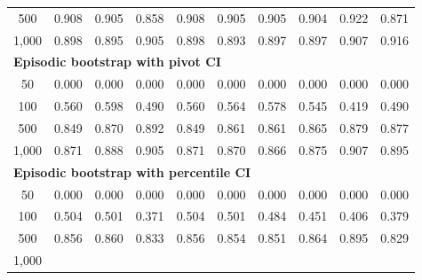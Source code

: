 \documentclass{article}
\numberwithin{equation}{section}
\begin{document}
\begin{table}[ht]
\begin{tabular}{c|ccc|cccccc}
500
& \cellcolor{covheat!100!white}0.908 & \cellcolor{covheat!100!white}0.905 & \cellcolor{covheat!79!white}0.858
& \cellcolor{covheat!100!white}0.908 & \cellcolor{covheat!100!white}0.905 & \cellcolor{covheat!100!white}0.905 & \cellcolor{covheat!100!white}0.904 & \cellcolor{covheat!100!white}0.922 & \cellcolor{covheat!85!white}0.871 \\
1{,}000
& \cellcolor{covheat!99!white}0.898 & \cellcolor{covheat!98!white}0.895 & \cellcolor{covheat!100!white}0.905
& \cellcolor{covheat!99!white}0.898 & \cellcolor{covheat!96!white}0.893 & \cellcolor{covheat!98!white}0.897 & \cellcolor{covheat!98!white}0.897 & \cellcolor{covheat!100!white}0.907 & \cellcolor{covheat!100!white}0.916 \\
\hline
\multicolumn{10}{l}{\textbf{Episodic bootstrap with pivot CI}} \\ \hline
50
& 0.000 & 0.000 & 0.000
& 0.000 & 0.000 & 0.000 & 0.000 & 0.000 & 0.000 \\
100
& 0.560 & 0.598 & 0.490
& 0.560 & 0.564 & 0.578 & 0.545 & 0.419 & 0.490 \\
500
& \cellcolor{covheat!74!white}0.849 & \cellcolor{covheat!85!white}0.870 & \cellcolor{covheat!96!white}0.892
& \cellcolor{covheat!74!white}0.849 & \cellcolor{covheat!80!white}0.861 & \cellcolor{covheat!80!white}0.861 & \cellcolor{covheat!82!white}0.865 & \cellcolor{covheat!89!white}0.879 & \cellcolor{covheat!88!white}0.877 \\
1{,}000
& \cellcolor{covheat!85!white}0.871 & \cellcolor{covheat!94!white}0.888 & \cellcolor{covheat!100!white}0.905
& \cellcolor{covheat!85!white}0.871 & \cellcolor{covheat!85!white}0.870 & \cellcolor{covheat!83!white}0.866 & \cellcolor{covheat!87!white}0.875 & \cellcolor{covheat!100!white}0.907 & \cellcolor{covheat!98!white}0.895 \\
\hline
\multicolumn{10}{l}{\textbf{Episodic bootstrap with percentile CI}} \\ \hline
50
& 0.000 & 0.000 & 0.000
& 0.000 & 0.000 & 0.000 & 0.000 & 0.000 & 0.000 \\
100
& 0.504 & 0.501 & 0.371
& 0.504 & 0.501 & 0.484 & 0.451 & 0.406 & 0.379 \\
500
& \cellcolor{covheat!78!white}0.856 & \cellcolor{covheat!80!white}0.860 & \cellcolor{covheat!66!white}0.833
& \cellcolor{covheat!78!white}0.856 & \cellcolor{covheat!77!white}0.854 & \cellcolor{covheat!75!white}0.851 & \cellcolor{covheat!82!white}0.864 & \cellcolor{covheat!98!white}0.895 & \cellcolor{covheat!64!white}0.829 \\
1{,}000

\end{tabular}
\end{table}
\end{document}
